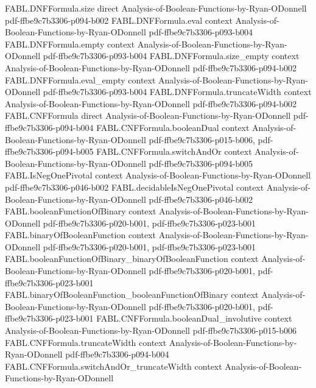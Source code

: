 \begin{theorem}
\proofstep
  {FABL.DNFFormula.size}
  {direct}
  {Analysis-of-Boolean-Functions-by-Ryan-ODonnell}
  {pdf-ffbe9c7b3306-p094-b002}
\proofstep
  {FABL.DNFFormula.eval}
  {context}
  {Analysis-of-Boolean-Functions-by-Ryan-ODonnell}
  {pdf-ffbe9c7b3306-p093-b004}
\proofstep
  {FABL.DNFFormula.empty}
  {context}
  {Analysis-of-Boolean-Functions-by-Ryan-ODonnell}
  {pdf-ffbe9c7b3306-p093-b004}
\proofstep
  {FABL.DNFFormula.size_empty}
  {context}
  {Analysis-of-Boolean-Functions-by-Ryan-ODonnell}
  {pdf-ffbe9c7b3306-p094-b002}
\proofstep
  {FABL.DNFFormula.eval_empty}
  {context}
  {Analysis-of-Boolean-Functions-by-Ryan-ODonnell}
  {pdf-ffbe9c7b3306-p093-b004}
\proofstep
  {FABL.DNFFormula.truncateWidth}
  {context}
  {Analysis-of-Boolean-Functions-by-Ryan-ODonnell}
  {pdf-ffbe9c7b3306-p094-b002}
\proofstep
  {FABL.CNFFormula}
  {direct}
  {Analysis-of-Boolean-Functions-by-Ryan-ODonnell}
  {pdf-ffbe9c7b3306-p094-b004}
\proofstep
  {FABL.CNFFormula.booleanDual}
  {context}
  {Analysis-of-Boolean-Functions-by-Ryan-ODonnell}
  {pdf-ffbe9c7b3306-p015-b006,
    pdf-ffbe9c7b3306-p094-b005}
\proofstep
  {FABL.CNFFormula.switchAndOr}
  {context}
  {Analysis-of-Boolean-Functions-by-Ryan-ODonnell}
  {pdf-ffbe9c7b3306-p094-b005}
\proofstep
  {FABL.IsNegOnePivotal}
  {context}
  {Analysis-of-Boolean-Functions-by-Ryan-ODonnell}
  {pdf-ffbe9c7b3306-p046-b002}
\proofstep
  {FABL.decidableIsNegOnePivotal}
  {context}
  {Analysis-of-Boolean-Functions-by-Ryan-ODonnell}
  {pdf-ffbe9c7b3306-p046-b002}
\proofstep
  {FABL.booleanFunctionOfBinary}
  {context}
  {Analysis-of-Boolean-Functions-by-Ryan-ODonnell}
  {pdf-ffbe9c7b3306-p020-b001,
    pdf-ffbe9c7b3306-p023-b001}
\proofstep
  {FABL.binaryOfBooleanFunction}
  {context}
  {Analysis-of-Boolean-Functions-by-Ryan-ODonnell}
  {pdf-ffbe9c7b3306-p020-b001,
    pdf-ffbe9c7b3306-p023-b001}
\proofstep
  {FABL.booleanFunctionOfBinary_binaryOfBooleanFunction}
  {context}
  {Analysis-of-Boolean-Functions-by-Ryan-ODonnell}
  {pdf-ffbe9c7b3306-p020-b001,
    pdf-ffbe9c7b3306-p023-b001}
\proofstep
  {FABL.binaryOfBooleanFunction_booleanFunctionOfBinary}
  {context}
  {Analysis-of-Boolean-Functions-by-Ryan-ODonnell}
  {pdf-ffbe9c7b3306-p020-b001,
    pdf-ffbe9c7b3306-p023-b001}
\proofstep
  {FABL.CNFFormula.booleanDual_involutive}
  {context}
  {Analysis-of-Boolean-Functions-by-Ryan-ODonnell}
  {pdf-ffbe9c7b3306-p015-b006}
\proofstep
  {FABL.CNFFormula.truncateWidth}
  {context}
  {Analysis-of-Boolean-Functions-by-Ryan-ODonnell}
  {pdf-ffbe9c7b3306-p094-b004}
\proofstep
  {FABL.CNFFormula.switchAndOr_truncateWidth}
  {context}
  {Analysis-of-Boolean-Functions-by-Ryan-ODonnell}

\end{theorem}
